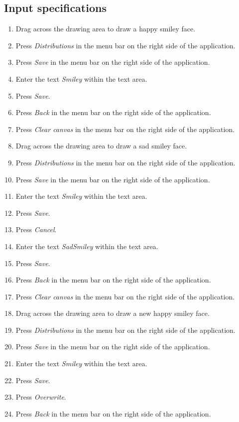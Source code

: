 \subsection*{Input specifications}
\begin{enumerate}
\item Drag across the drawing area to draw a happy smiley face.
\item Press \emph{Distributions} in the menu bar on the right side of the application.
\item Press \emph{Save} in the menu bar on the right side of the application.
\item Enter the text \emph{Smiley} within the text area.
\item Press \emph{Save}.

\item Press \emph{Back} in the menu bar on the right side of the application.
\item Press \emph{Clear canvas} in the menu bar on the right side of the application. 
\item Drag across the drawing area to draw a sad smiley face.
\item Press \emph{Distributions} in the menu bar on the right side of the application.
\item Press \emph{Save} in the menu bar on the right side of the application.

\item Enter the text \emph{Smiley} within the text area.
\item Press \emph{Save}.
\item Press \emph{Cancel}.
\item Enter the text \emph{SadSmiley} within the text area.
\item Press \emph{Save}.

\item Press \emph{Back} in the menu bar on the right side of the application.
\item Press \emph{Clear canvas} in the menu bar on the right side of the application.
\item Drag across the drawing area to draw a new happy smiley face.
\item Press \emph{Distributions} in the menu bar on the right side of the application.
\item Press \emph{Save} in the menu bar on the right side of the application.

\item Enter the text \emph{Smiley} within the text area.
\item Press \emph{Save}.
\item Press \emph{Overwrite}.
\item Press \emph{Back} in the menu bar on the right side of the application.
\end{enumerate}

